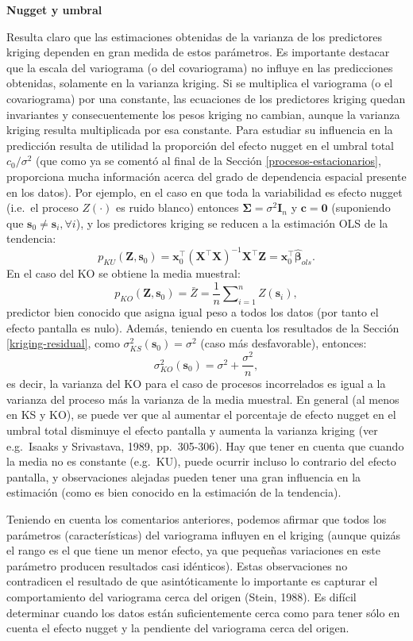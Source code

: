 \documentclass[
]{book}
\theoremstyle{break}
\theoremstyle{definition}
\theoremstyle{definition}
\theoremstyle{definition}
\theoremstyle{definition}
\theoremstyle{remark}
\begin{document}
\textbf{Nugget y umbral}

Resulta claro que las estimaciones obtenidas de la varianza de los predictores kriging dependen en gran medida de estos parámetros.
Es importante destacar que la escala del variograma (o del covariograma) no influye en las predicciones obtenidas, solamente en la varianza kriging.
Si se multiplica el variograma (o el covariograma) por una constante, las ecuaciones de los predictores kriging quedan invariantes y consecuentemente los pesos kriging no cambian, aunque la varianza kriging resulta multiplicada por esa constante.
Para estudiar su influencia en la predicción resulta de utilidad la proporción del efecto nugget en el umbral total \(c_{0} /\sigma^{2}\) (que como ya se comentó al final de la Sección \ref{procesos-estacionarios}, proporciona mucha información acerca del grado de dependencia espacial presente en los datos).
Por ejemplo, en el caso en que toda la variabilidad es efecto nugget (i.e.~el proceso \(Z(\cdot)\) es ruido blanco) entonces \(\boldsymbol{\Sigma}=\sigma^{2} \mathbf{I}_{n}\) y \(\mathbf{c}=\mathbf{0}\) (suponiendo que \(\mathbf{s}_{0}\neq \mathbf{s}_{i}, \forall i\)), y los predictores kriging se reducen a la estimación OLS de la tendencia:
\[p_{KU} (\mathbf{Z},\mathbf{s}_{0}) = \mathbf{x}_0^\top(\mathbf{X }^\top\mathbf{X})^{-1} \mathbf{X}^\top\mathbf{Z} = \mathbf{x }_0^\top\hat{\boldsymbol{\beta}}_{ols}.\]
En el caso del KO se obtiene la media muestral:
\[p_{KO} (\mathbf{Z},\mathbf{s}_{0})=\bar{Z} =\dfrac{1}{n}
\sum\nolimits_{i=1}^{n}Z(\mathbf{s}_{i}),\]
predictor bien conocido que asigna igual peso a todos los datos (por tanto el efecto pantalla es nulo).
Además, teniendo en cuenta los resultados de la Sección \ref{kriging-residual}, como \(\sigma_{KS}^{2} (\mathbf{s}_{0})=\sigma^{2}\) (caso más desfavorable), entonces:
\[\sigma_{KO}^{2} (\mathbf{s}_{0})=\sigma_{}^{2} +\dfrac{\sigma_{}^{2}
}{n},\]
es decir, la varianza del KO para el caso de procesos incorrelados es igual a la varianza del proceso más la varianza de la media muestral.
En general (al menos en KS y KO), se puede ver que al aumentar el porcentaje de efecto nugget en el umbral total disminuye el efecto pantalla y aumenta la varianza kriging (ver e.g.~Isaaks y Srivastava, 1989, pp.~305-306).
Hay que tener en cuenta que cuando la media no es constante (e.g.~KU), puede ocurrir incluso lo contrario del efecto pantalla, y observaciones alejadas pueden tener una gran influencia en la estimación (como es bien conocido en la estimación de la tendencia).

Teniendo en cuenta los comentarios anteriores, podemos afirmar que todos los parámetros (características) del variograma influyen en el kriging (aunque quizás el rango es el que tiene un menor efecto, ya que pequeñas variaciones en este parámetro producen resultados casi idénticos).
Estas observaciones no contradicen el resultado de que asintóticamente lo importante es capturar el comportamiento del variograma cerca del origen (Stein, 1988).
Es difícil determinar cuando los datos están suficientemente cerca como para tener sólo en cuenta el efecto nugget y la pendiente del variograma cerca del origen.
\end{document}
